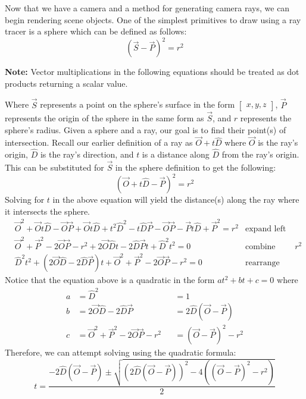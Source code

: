 Now that we have a camera and a method for generating camera rays, we can begin rendering scene objects. One of the simplest primitives to draw using a ray tracer is a sphere which can be defined as follows:
$$(\Vec{S} - \Vec{P})^2 = r^2$$
\begin{tcolorbox}
\textbf{Note:} Vector multiplications in the following equations should be treated as dot products returning a scalar value.
\end{tcolorbox}
\noindent
Where $\Vec{S}$ represents a point on the sphere's surface in the form $\begin{bmatrix} x, y, z \end{bmatrix}$, $\Vec{P}$ represents the origin of the sphere in the same form as $\Vec{S}$, and $r$ represents the sphere's radius. Given a sphere and a ray, our goal is to find their point(s) of intersection. Recall our earlier definition of a ray as $\Vec{O} + t\hat{D}$ where $\Vec{O}$ is the ray's origin, $\hat{D}$ is the ray's direction, and $t$ is a distance along $\hat{D}$ from the ray's origin. This can be substituted for $\Vec{S}$ in the sphere definition to get the following:
$$(\Vec{O} + t\hat{D} - \Vec{P})^2 = r^2$$
Solving for $t$ in the above equation will yield the distance(s) along the ray where it intersects the sphere.
\begin{align*}
    &\Vec{O}^2 + \Vec{O}t\hat{D} - \Vec{O}\Vec{P} + \Vec{O}t\hat{D}  + t^2\hat{D}^2 - t\hat{D}\Vec{P} - \Vec{O}\Vec{P} - \Vec{P}t\hat{D} + \Vec{P}^2 = r^2 &\text{expand left side}&\\
    &\Vec{O}^2 + \Vec{P}^2 - 2\Vec{O}\Vec{P}  - r^2 + 2\Vec{O}\hat{D}t - 2\hat{D}\Vec{P}t + \hat{D}^2t^2 = 0 &\text{combine terms and move $r^2$}&\\
    &\hat{D}^2t^2 + (2\Vec{O}\hat{D}-2\hat{D}\Vec{P})t + \Vec{O}^2 + \Vec{P}^2 - 2\Vec{O}\Vec{P} - r^2 = 0 &\text{rearrange terms}&
\end{align*}
Notice that the equation above is a quadratic in the form $at^2 + bt + c = 0$ where 
\begin{align*}
    a &= \hat{D}^2 &&= 1 \\
    b &= 2\Vec{O}\hat{D}-2\hat{D}\Vec{P} &&= 2\hat{D}(\Vec{O}-\Vec{P}) \\
    c &= \Vec{O}^2 + \Vec{P}^2 - 2\Vec{O}\Vec{P} - r^2 &&= (\Vec{O}-\Vec{P})^2-r^2
\end{align*}
Therefore, we can attempt solving using the quadratic formula:
$$
t = \frac{-2\hat{D}(\Vec{O}-\Vec{P}) \pm \sqrt{(2\hat{D}(\Vec{O}-\Vec{P}))^2 - 4((\Vec{O}-\Vec{P})^2-r^2)}}{2}
$$

